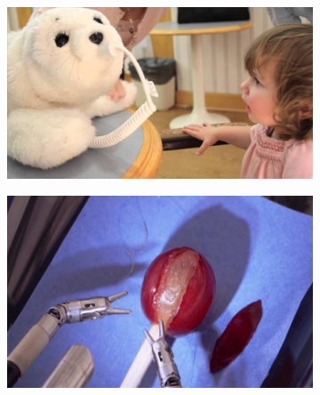 \documentclass[runningheads,a4paper,12pt]{report}
\begin{document}
\begin{figure}
  \begin{subfigure}{.5\textwidth}
  	\centering
  	\includegraphics[width=\linewidth]{./images/1_consumer_robot}
  	\caption{}
  	\label{fig:consumer}
  \end{subfigure} 
  \hfill  
  \begin{subfigure}{.45\textwidth}
  	\centering
  	\includegraphics[width=\linewidth]{./images/1_medical_robot}\hfill
  	\caption{}
  	\label{fig:medical}
  \end{subfigure}\par\medskip
  

\end{figure}
\end{document}
